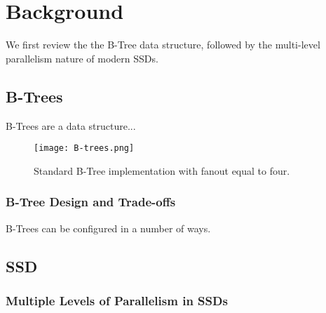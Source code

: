 \section{Background}
We first review the the B-Tree data structure, followed by the multi-level parallelism nature of modern SSDs.

\subsection{B-Trees}
B-Trees are a data structure...

\begin{figure}[btree]
\texttt{[image: B-trees.png]}
\caption{Standard B-Tree implementation \cite{btrees} with fanout equal to four.}
\label{btree}
\end{figure}

\subsubsection{B-Tree Design and Trade-offs}
B-Trees can be configured in a number of ways. 




\subsection{SSD}

\subsubsection{Multiple Levels of Parallelism in SSDs}

